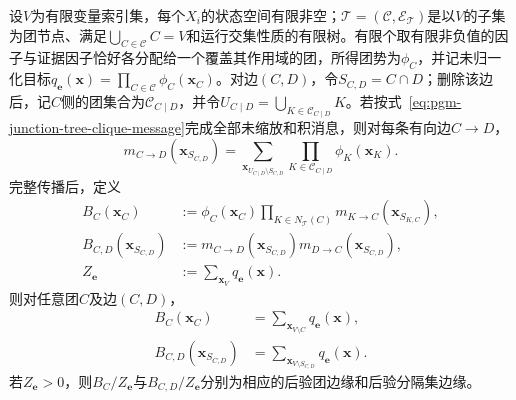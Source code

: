 \begin{theorem}[子树消息与团边缘]
  \label{thm:pgm-junction-tree-correctness}
  设$V$为有限变量索引集，每个$X_i$的状态空间有限非空；$\mathcal{T}=(\mathcal{C},\mathcal{E}_{\mathcal T})$是以$V$的子集为团节点、满足$\bigcup_{C\in\mathcal C}C=V$和运行交集性质的有限树。有限个取有限非负值的因子与证据因子恰好各分配给一个覆盖其作用域的团，所得团势为$\phi_C$，并记未归一化目标$q_{\bm e}(\bm{x})=\prod_{C\in\mathcal C}\phi_C(\bm{x}_C)$。对边$(C,D)$，令$S_{C,D}=C\cap D$；删除该边后，记$C$侧的团集合为$\mathcal{C}_{C\mid D}$，并令$U_{C\mid D}=\bigcup_{K\in\mathcal{C}_{C\mid D}}K$。若按式~\eqref{eq:pgm-junction-tree-clique-message}完成全部未缩放和积消息，则对每条有向边$C\to D$，
  \begin{equation}
    m_{C\to D}(\bm{x}_{S_{C,D}})
      =\sum_{\bm{x}_{U_{C\mid D}\setminus S_{C,D}}}
         \prod_{K\in\mathcal{C}_{C\mid D}}\phi_K(\bm{x}_K).
    \label{eq:pgm-junction-tree-subtree-invariant}
  \end{equation}
  完整传播后，定义
  \[
    \begin{aligned}
      B_C(\bm{x}_C)&\mathrel{:=}
        \phi_C(\bm{x}_C)
        \prod_{K\in N_{\mathcal{T}}(C)}
          m_{K\to C}(\bm{x}_{S_{K,C}}),\\
      B_{C,D}(\bm{x}_{S_{C,D}})&\mathrel{:=}
        m_{C\to D}(\bm{x}_{S_{C,D}})
        m_{D\to C}(\bm{x}_{S_{C,D}}),\\
      Z_{\bm e}&\mathrel{:=}
        \sum_{\bm{x}_V}q_{\bm e}(\bm{x}).
    \end{aligned}
  \]
  则对任意团$C$及边$(C,D)$，
  \begin{equation}
    \begin{aligned}
      B_C(\bm{x}_C)
        &=\sum_{\bm{x}_{V\setminus C}}q_{\bm{e}}(\bm{x}),\\
      B_{C,D}(\bm{x}_{S_{C,D}})
        &=\sum_{\bm{x}_{V\setminus S_{C,D}}}q_{\bm{e}}(\bm{x}).
    \end{aligned}
    \label{eq:pgm-junction-tree-true-marginals}
  \end{equation}
  若$Z_{\bm e}>0$，则$B_C/Z_{\bm e}$与$B_{C,D}/Z_{\bm e}$分别为相应的后验团边缘和后验分隔集边缘。
\end{theorem}

